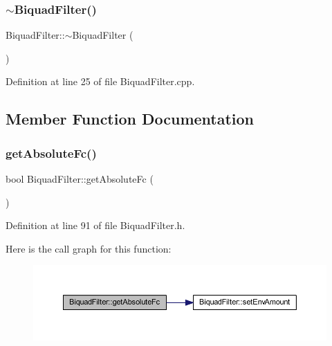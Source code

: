 \subsubsection{\texorpdfstring{$\sim$\+Biquad\+Filter()}{~BiquadFilter()}}
{\footnotesize\ttfamily Biquad\+Filter\+::$\sim$\+Biquad\+Filter (\begin{DoxyParamCaption}{ }\end{DoxyParamCaption})}



Definition at line 25 of file Biquad\+Filter.\+cpp.



\subsection{Member Function Documentation}
\mbox{\label{class_biquad_filter_a4e2b1fd4bb0af7f4bea4709b1bf51792}} 
\subsubsection{\texorpdfstring{get\+Absolute\+Fc()}{getAbsoluteFc()}}
{\footnotesize\ttfamily bool Biquad\+Filter\+::get\+Absolute\+Fc (\begin{DoxyParamCaption}{ }\end{DoxyParamCaption})\hspace{0.3cm}{\ttfamily [inline]}}



Definition at line 91 of file Biquad\+Filter.\+h.

Here is the call graph for this function\+:
\nopagebreak
\begin{figure}[H]
\begin{center}
\leavevmode
\includegraphics[width=350pt]{d9/d6f/class_biquad_filter_a4e2b1fd4bb0af7f4bea4709b1bf51792_cgraph}
\end{center}
\end{figure}
\mbox{\label{class_biquad_filter_a00fd6c36ca50169705ad5c00560341d9}} 
